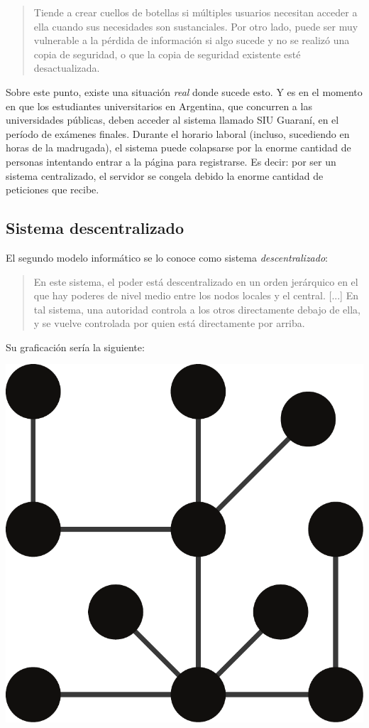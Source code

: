 \documentclass[12pt,a4paper,twoside]{book}
\begin{document}
\begin{quotation}
Tiende a crear cuellos de botellas si múltiples usuarios necesitan acceder a ella cuando sus necesidades son sustanciales. Por otro lado, puede ser muy vulnerable a la pérdida de información si algo sucede y no se realizó una copia de seguridad, o que la copia de seguridad existente esté desactualizada. \cite{sist:central}
\end{quotation}

Sobre este punto, existe una situación \textit{real} donde sucede esto. Y es en el momento en que los estudiantes universitarios en Argentina, que concurren a las universidades públicas, deben acceder al sistema llamado SIU Guaraní, en el período de exámenes finales. Durante el horario laboral (incluso, sucediendo en horas de la madrugada), el sistema puede colapsarse por la enorme cantidad de personas intentando entrar a la página para registrarse. Es decir: por ser un sistema centralizado, el servidor se congela debido la enorme cantidad de peticiones que recibe.

\subsection{Sistema descentralizado}
El segundo modelo informático se lo conoce como sistema \textit{descentralizado}:

\begin{quotation}
En este sistema, el poder está descentralizado en un orden jerárquico en el que hay poderes de nivel medio entre los nodos locales y el central. [...] En tal sistema, una autoridad controla a los otros directamente debajo de ella, y se vuelve controlada por quien está directamente por arriba. \cite{sist:cffn}
\end{quotation}

Su graficación sería la siguiente:

\begin{center}
\includegraphics[scale=0.25]{img/tiposist-descentral.pdf}
\end{center}
\end{document}

